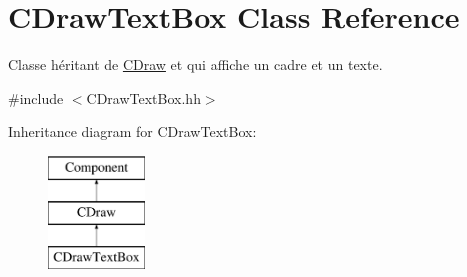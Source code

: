 \hypertarget{class_c_draw_text_box}{}\section{C\+Draw\+Text\+Box Class Reference}
\label{class_c_draw_text_box}


Classe héritant de \hyperlink{class_c_draw}{C\+Draw} et qui affiche un cadre et un texte.  




{\ttfamily \#include $<$C\+Draw\+Text\+Box.\+hh$>$}

Inheritance diagram for C\+Draw\+Text\+Box\+:\begin{figure}[H]
\begin{center}
\leavevmode
\includegraphics[height=3.000000cm]{class_c_draw_text_box}
\end{center}
\end{figure}
